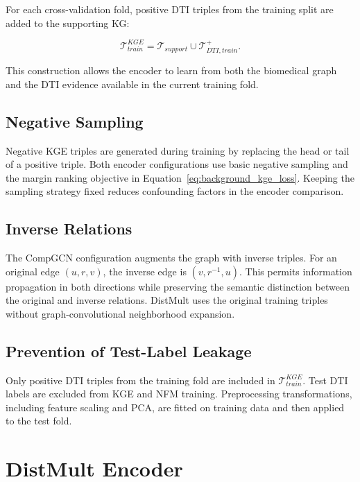 For each cross-validation fold, positive DTI triples from the training split
are added to the supporting KG:

\begin{equation}
    \mathcal{T}_{train}^{KGE}
    =
    \mathcal{T}_{support}
    \cup
    \mathcal{T}_{DTI,train}^{+}.
    \label{eq:kge_training_graph}
\end{equation}

This construction allows the encoder to learn from both the biomedical graph
and the DTI evidence available in the current training fold.

\subsection{Negative Sampling}

Negative KGE triples are generated during training by replacing the head or
tail of a positive triple. Both encoder configurations use basic negative
sampling and the margin ranking objective in
Equation~\ref{eq:background_kge_loss}. Keeping the sampling strategy fixed
reduces confounding factors in the encoder comparison.

\subsection{Inverse Relations}

The CompGCN configuration augments the graph with inverse triples. For an
original edge $(u,r,v)$, the inverse edge is $(v,r^{-1},u)$. This permits
information propagation in both directions while preserving the semantic
distinction between the original and inverse relations. DistMult uses the
original training triples without graph-convolutional neighborhood expansion.

\subsection{Prevention of Test-Label Leakage}

Only positive DTI triples from the training fold are included in
$\mathcal{T}_{train}^{KGE}$. Test DTI labels are excluded from KGE and NFM
training. Preprocessing transformations, including feature scaling and PCA,
are fitted on training data and then applied to the test fold.

\section{DistMult Encoder}

